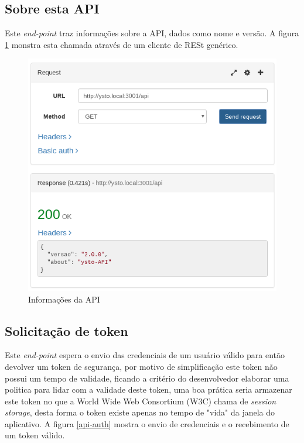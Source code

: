 \subsection{Sobre esta API}
Este \textit{end-point} traz informações sobre a API, dados como nome e versão. A figura \ref{api-about} monstra esta chamada através de um cliente de RESt genérico.

\begin{figure}[H]
\caption{\label{api-about} Informações da API}
\includegraphics[scale=0.35]{img/05-api-about.png}
\end{figure}

\subsection{Solicitação de token}
Este \textit{end-point} espera o envio das credenciais de um usuário válido para então devolver um token de segurança, por motivo de simplificação este token não possui um tempo de validade, ficando a critério do desenvolvedor elaborar uma politica para lidar com a validade deste token, uma boa prática seria armazenar este token no que a World Wide Web Consortium (W3C) chama de \textit{session storage}, desta forma o token existe apenas no tempo de "vida" da janela do aplicativo. A figura \ref{api-auth} mostra o envio de credenciais e o recebimento de um token válido.

